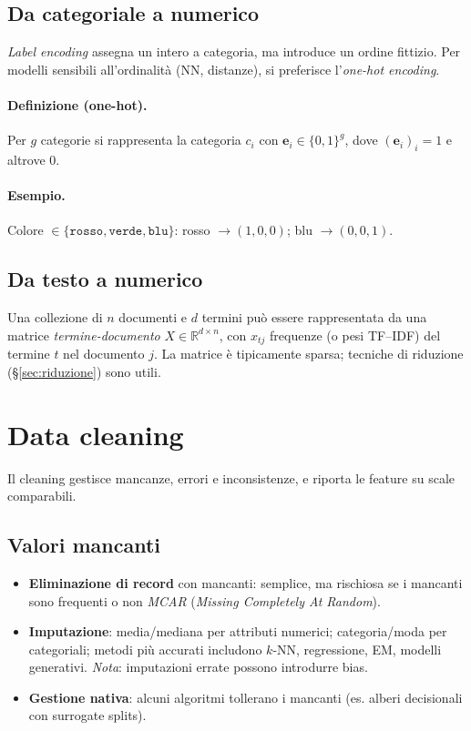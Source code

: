 \subsection{Da categoriale a numerico}\label{subsec:cat2num}
\emph{Label encoding} assegna un intero a categoria, ma introduce un ordine fittizio. Per modelli sensibili all'ordinalità (NN, distanze), si preferisce l'\emph{one-hot encoding}.
\paragraph{Definizione (one-hot).} Per $g$ categorie si rappresenta la categoria $c_i$ con $\mathbf{e}_i\in\{0,1\}^g$, dove $(\mathbf{e}_i)_i=1$ e altrove 0.
\paragraph{Esempio.} Colore $\in\{\texttt{rosso},\texttt{verde},\texttt{blu}\}$: rosso $\to(1,0,0)$; blu $\to(0,0,1)$.

\subsection{Da testo a numerico}\label{subsec:text2num}
Una collezione di $n$ documenti e $d$ termini può essere rappresentata da una matrice \emph{termine-documento} $X\in\mathbb{R}^{d\times n}$, con $x_{tj}$ frequenze (o pesi TF--IDF) del termine $t$ nel documento $j$. La matrice è tipicamente sparsa; tecniche di riduzione (\S\ref{sec:riduzione}) sono utili.

\section{Data cleaning}\label{sec:cleaning}
Il cleaning gestisce mancanze, errori e inconsistenze, e riporta le feature su scale comparabili.

\subsection{Valori mancanti}\label{subsec:missing}
\begin{itemize}
  \item \textbf{Eliminazione di record} con mancanti: semplice, ma rischiosa se i mancanti sono frequenti o non \emph{MCAR} (\emph{Missing Completely At Random}).
  \item \textbf{Imputazione}: media/mediana per attributi numerici; categoria/moda per categoriali; metodi più accurati includono $k$-NN, regressione, EM, modelli generativi. \emph{Nota}: imputazioni errate possono introdurre bias.
  \item \textbf{Gestione nativa}: alcuni algoritmi tollerano i mancanti (es. alberi decisionali con surrogate splits).
\end{itemize}
